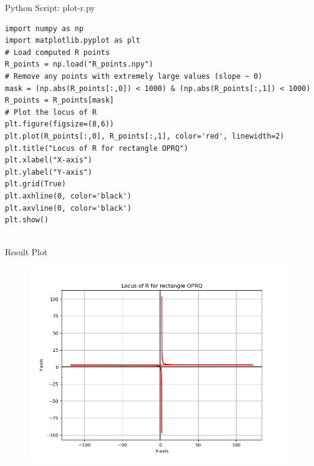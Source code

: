 \documentclass{beamer}
\numberwithin{equation}{section}
\theoremstyle{remark}
\begin{document}
\begin{frame}[fragile]{Python Script: plot-r.py}
\begin{verbatim}
import numpy as np
import matplotlib.pyplot as plt
# Load computed R points
R_points = np.load("R_points.npy")
# Remove any points with extremely large values (slope ~ 0)
mask = (np.abs(R_points[:,0]) < 1000) & (np.abs(R_points[:,1]) < 1000)
R_points = R_points[mask]
# Plot the locus of R
plt.figure(figsize=(8,6))
plt.plot(R_points[:,0], R_points[:,1], color='red', linewidth=2)
plt.title("Locus of R for rectangle OPRQ")
plt.xlabel("X-axis")
plt.ylabel("Y-axis")
plt.grid(True)
plt.axhline(0, color='black')
plt.axvline(0, color='black')
plt.show()


\end{verbatim}
\end{frame}

\begin{frame}{Result Plot}
 \begin{figure}[H]
     \centering
     \includegraphics[width=0.7\columnwidth]{figs/fig1.png}
     \caption*{}
     \label{fig:fig1}
 \end{figure}
 
\end{frame}
\end{document}
